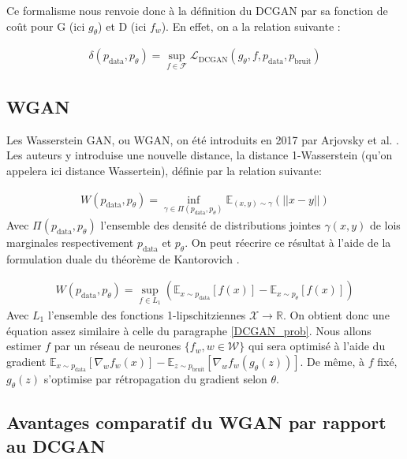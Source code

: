 Ce formalisme nous renvoie donc à la définition du DCGAN par sa fonction de coût pour G (ici $g_{\theta}$) et D (ici $f_{w}$). En effet, on a la relation suivante : 

$$\begin{aligned}
\delta(p_{\mathrm{data}}, p_{\theta}) = \sup_{f\in\mathcal{F}} \mathcal{L}_{\mathrm{DCGAN}}(g_{\theta}, f, p_{\mathrm{data}},  p_{\mathrm{bruit}})
\end{aligned}$$

\subsection{WGAN} \label{WGAN}

Les Wasserstein GAN, ou WGAN, on été introduits en 2017 par Arjovsky et al. \cite{arjovsky_wasserstein_2017}. Les auteurs y introduise une nouvelle distance, la distance 1-Wasserstein (qu'on appelera ici distance Wassertein), définie par la relation suivante:

$$\begin{aligned}
W(p_{\mathrm{data}}, p_{\theta}) = \inf_{\gamma \in \Pi (p_{\mathrm{data}}, p_{\theta})} \mathbb{E}_{(x, y) \sim \gamma} (||x - y||)
\end{aligned}$$
Avec $\Pi (p_{\mathrm{data}}, p_{\theta})$ l'ensemble des densité de distributions jointes $\gamma (x, y)$ de lois marginales respectivement $p_{\mathrm{data}}$ et $p_{\theta}$. On peut réecrire ce résultat à l'aide de la formulation duale du théorème de Kantorovich \cite{villani_optimal_2006}.


$$\begin{aligned}
W(p_{\mathrm{data}}, p_{\theta}) = \sup_{f \in L_{1}}\left(\mathbb{E}_{x\sim p_{\mathrm{data}}} [f(x)] - \mathbb{E}_{x\sim p_{\theta}} [f(x)]\right)
\end{aligned}$$
 Avec $L_{1}$ l'ensemble des fonctions 1-lipschitziennes $\mathcal{X} \longrightarrow \mathbb{R}$. On obtient donc une équation assez similaire à celle du paragraphe \ref{DCGAN_prob}. Nous allons estimer $f$ par un réseau de neurones $\{f_{w}, w \in \mathcal{W} \}$ qui sera optimisé à l'aide du gradient $\mathbb{E}_{x\sim p_{\mathrm{data}}} \left[\nabla_{w}f_{w}(x)\right] - \mathbb{E}_{z\sim p_{\mathrm{bruit}}} \left[\nabla_{w}f_{w}(g_{\theta}(z))\right]$. De même, à $f$ fixé, $g_{\theta}(z)$ s'optimise par rétropagation du gradient selon $\theta$.
 
\subsection{Avantages comparatif du WGAN par rapport au DCGAN}
 
